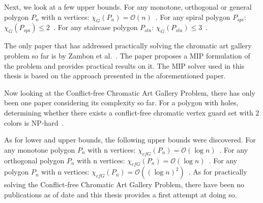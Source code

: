 Next, we look at a few upper bounds.
For any monotone, orthogonal or general polygon $P_n$ with n vertices: $\chi_G(P_n) = \mathcal{O}(n)$~\cite{bartschi2011coloring}.
For any spiral polygon $P_{spi}$: $\chi_G(P_{spi}) \leq 2$~\cite{erickson2012art}.
For any staircase polygon $P_{sta}$: $\chi_G(P_{sta}) \leq 3$~\cite{erickson2012art}.

The only paper that has addressed practically solving the chromatic art gallery problem so far is by Zambon et al.~\cite{zambon2014exact}. The paper proposes a MIP formulation of the problem and provides practical results on it. The MIP solver used in this thesis is based on the approach presented in the aforementioned paper.

Now looking at the Conflict-free Chromatic Art Gallery Problem, there has only been one paper considering its complexity so far.
For a polygon with holes, determining whether there exists a conflict-free chromatic vertex guard set with $2$ colors is NP-hard~\cite{iwamoto2022vertex}.

As for lower and upper bounds, the following upper bounds were discovered.
For any monotone polygon $P_n$ with n vertices: $\chi_{cfG}(P_n) = \mathcal{O}(\log n)$~\cite{bartschi2011coloring}.
For any orthogonal polygon $P_n$ with n vertices: $\chi_{cfG}(P_n) = \mathcal{O}(\log n)$~\cite{bartschi2011coloring}.
For any polygon $P_n$ with n vertices: $\chi_{cfG}(P_n) = \mathcal{O}((\log n)^2)$~\cite{bartschi2011coloring}.
As for practically solving the Conflict-free Chromatic Art Gallery Problem, there have been no publications as of date and this thesis provides a first attempt at doing so.


